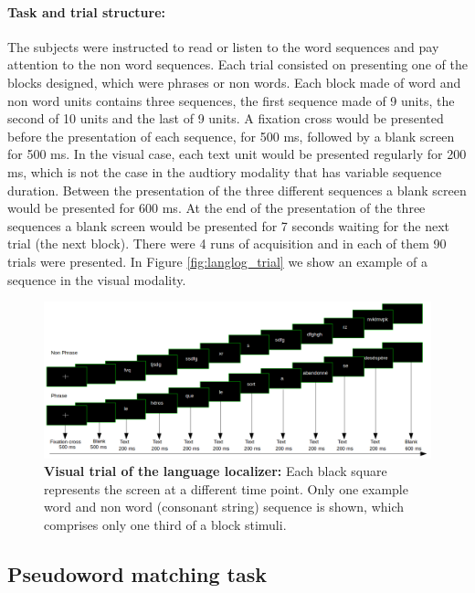 \paragraph{Task and trial structure:}
The subjects were instructed to read or listen to the word sequences and pay attention to the non word sequences.
Each trial consisted on presenting one of the blocks designed, which were phrases or non words.
Each block made of word and non word units contains three sequences, the first sequence made of 9 units, the second of 10 units and the last of 9 units.
A fixation cross would be presented before the presentation of each sequence, for 500 ms, followed by a blank screen for 500 ms.
In the visual case, each text unit would be presented regularly for 200 ms, which is not the case in the audtiory modality that has variable sequence duration.
Between the presentation of the three different sequences a blank screen would be presented for 600 ms.
At the end of the presentation of the three sequences a blank screen would be presented for 7 seconds waiting for the next trial (the next block).
There were 4 runs of acquisition and in each of them 90 trials were
presented.
In Figure \ref{fig:langlog_trial} we show an example of a sequence in the visual modality.

\begin{figure}[hptb]
\centering
\includegraphics[width=1.0 \linewidth]{figures/part_II/langloc_trial.png}
\caption{\textbf{Visual trial of the language localizer:}
Each black square represents the screen at a different time point.
Only one example word and non word (consonant string) sequence is shown, which comprises only one third of a block stimuli.
}
\label{fig:langloc_trial}
\end{figure}


\subsection{Pseudoword matching task}

